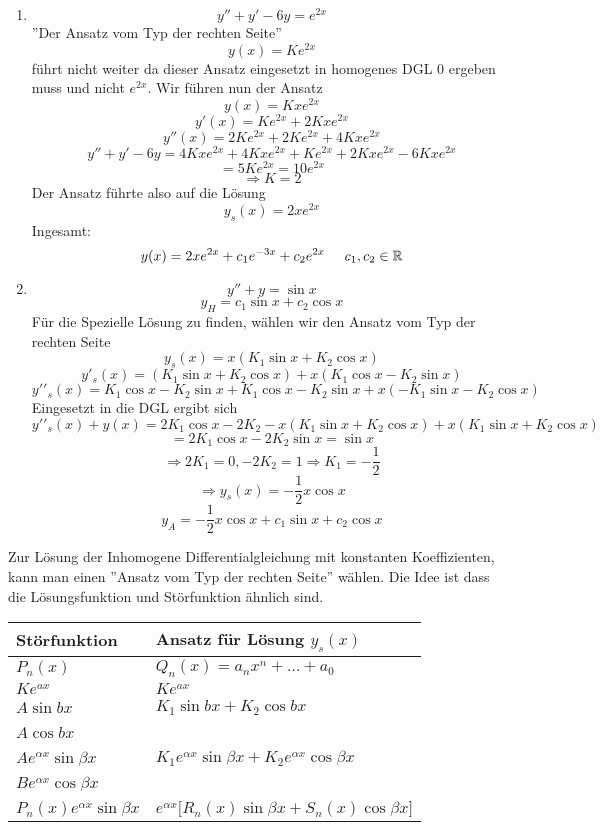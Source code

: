 \begin{enumerate}[\indent 3.]
\item $$y''+y'-6y=e^{2x}$$''Der Ansatz vom Typ der rechten Seite''$$y(x)=Ke^{2x}$$ führt nicht weiter da dieser Ansatz eingesetzt in homogenes DGL 0 ergeben muss und nicht $e^{2x}$. Wir führen nun der Ansatz
$$y(x)=Kxe^{2x}$$
$$y'(x) = K{e^{2x}} + 2Kx{e^{2x}}$$
$$y''(x) = 2K{e^{2x}} + 2K{e^{2x}} + 4Kx{e^{2x}}$$
$$y'' + y' - 6y = 4Kx{e^{2x}} + 4Kx{e^{2x}} + K{e^{2x}} + 2Kx{e^{2x}} - 6Kx{e^{2x}}$$
$$ = 5K{e^{2x}} = 10{e^{2x}}$$
$$\Rightarrow K=2$$
Der Ansatz führte also auf die Lösung $$y_s(x)=2xe^{2x}$$
Ingesamt: $$y(x)=2xe^{2x}+c_1e^{-3x}+c_2e^{2x}\text{\hspace{5mm}}c_1,c_2\in\mathbb{R}$$
\item $$y''+y=\sin x$$$$y_H=c_1\sin x+c_2\cos x$$
Für die Spezielle Lösung zu finden, wählen wir den Ansatz vom Typ der rechten Seite
$${y_s}(x) = x\left( {{K_1}\sin x + {K_2}\cos x} \right)$$
$$y{'_s}(x) = \left( {{K_1}\sin x + {K_2}\cos x} \right) + x\left( {{K_1}\cos x - {K_2}\sin x} \right)$$
$$y'{'_s}(x) = {K_1}\cos x - {K_2}\sin x + {K_1}\cos x - {K_2}\sin x + x\left( { - {K_1}\sin x - {K_2}\cos x} \right)$$
Eingesetzt in die DGL ergibt sich
$$y'{'_s}(x) + y(x) = 2{K_1}\cos x - 2{K_2} - x({K_1}\sin x + {K_2}\cos x) + x({K_1}\sin x + {K_2}\cos x)$$
$$=2K_1\cos x-2K_2 \sin x=\sin x$$
$$\Rightarrow 2K_1=0, -2K_2=1\Rightarrow K_1=-\frac{1}{2}$$
$$\Rightarrow y_s(x)=-\frac{1}{2}x\cos x$$
$$y_A=-\frac{1}{2}x\cos x+c_1 \sin x+c_2\cos x$$
\end{enumerate}
Zur Lösung der Inhomogene Differentialgleichung mit konstanten Koeffizienten, kann man einen ''Ansatz vom Typ der rechten Seite'' wählen. Die Idee ist dass die Lösungsfunktion und Störfunktion ähnlich sind.

\renewcommand{\arraystretch}{1.6}
\begin{tabularx}{\textwidth}{|Y|Y|}
\hline
Störfunktion & Ansatz für Lösung $y_s(x)$  \\\hline\hline
$P_n(x)$        & $Q_n(x)=a_nx^n+\dots+a_0$  \\ [1.5ex]\hline
$Ke^{ax}$        & $Ke^{ax}$  \\ [1.5ex]\hline
$A\sin bx$        & $K_1\sin bx +K_2\cos bx $  \\ [1.5ex]
$A\cos bx$        & ~  \\ [1.5ex]\hline
$Ae^{\alpha x}\sin \beta x$        & $K_1e^{\alpha x}\sin\beta x+K_2 e^{\alpha x}\cos\beta x$  \\ [1.5ex]
$Be^{\alpha x}\cos \beta x$        & ~  \\ [1.5ex]\hline
$P_n(x)e^{\alpha x}\sin\beta x$        & $e^{\alpha x}\lbrack R_n(x)\sin\beta x+S_n(x)\cos\beta x\rbrack$  \\ [1.5ex]\hline
 \end{tabularx}\\

